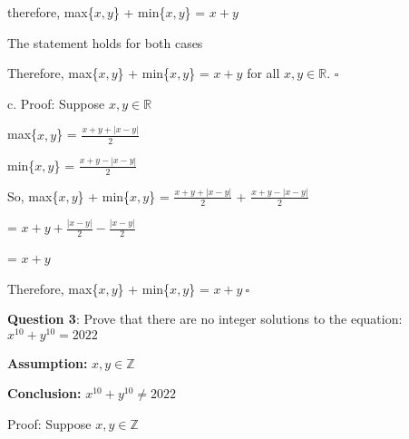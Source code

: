 \documentclass{article} %
\newcommand{\question}[2][]{\begin{flushleft}
        \textbf{Question #1}: #2
\end{flushleft}}
\begin{document}
    \tabto{1.3cm} therefore, max\{$x, y$\} + min\{$x, y$\} = $x + y$

    \vspace*{0.1cm}

    \tabto{1cm} The statement holds for both cases

    \tabto{1cm} Therefore, max\{$x, y$\} + min\{$x, y$\} = $x + y$ for all $x, y \in \mathbb{R}$. $\square$

    \vspace*{0.3cm}

    c. Proof: Suppose $x, y \in \mathbb{R}$
    
    \vspace*{0.1cm}

    \tabto{1cm} max\{$x, y$\} = $\frac{x + y + |x - y|}{2}$

    \vspace*{0.1cm}

    \tabto{1cm} min\{$x, y$\} = $\frac{x + y - |x - y|}{2}$

    \vspace*{0.1cm}

    \tabto{1cm} So, max\{$x, y$\} + min\{$x, y$\} = $\frac{x + y + |x - y|}{2}$ + $\frac{x + y - |x - y|}{2}$

    \vspace*{0.1cm}

    \tabto{5.25cm} = $x + y + \frac{|x-y|}{2} - \frac{|x-y|}{2}$

    \tabto{5.25cm} = $x + y$

    \tabto{1cm} Therefore, max\{$x, y$\} + min\{$x, y$\} = $x + y\ \square$

    \newpage


    \question[3]{Prove that there are no integer solutions to the equation: $x^{10} + y^{10} = 2022$}

    \textbf{Assumption:} $x, y \in \mathbb{Z}$
    
    \textbf{Conclusion:} $x^{10} + y^{10} \neq 2022$

    \vspace*{0.3cm}

    Proof: Suppose $x, y \in \mathbb{Z}$
\end{document}

